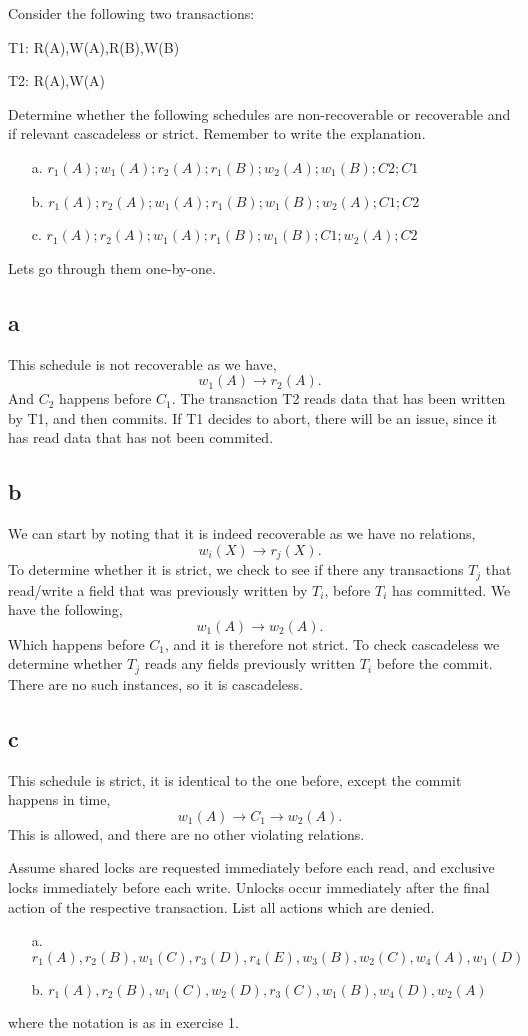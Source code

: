 \documentclass[working, oneside]{../../Preambles/tuftebook}
\begin{document}
\begin{exercise}[2]
Consider the following two transactions:

T1: R(A),W(A),R(B),W(B)

T2: R(A),W(A)

Determine whether the following schedules are non-recoverable or recoverable and if relevant cascadeless or strict. Remember to write the explanation.
\begin{enumerate}
    \item[a.] \(r_1(A); w_1(A); r_2(A); r_1(B); w_2(A); w_1(B); C2; C1\)
    \item[b.] \(r_1(A); r_2(A); w_1(A); r_1(B); w_1(B); w_2(A); C1; C2\)
    \item[c.] \(r_1(A); r_2(A); w_1(A); r_1(B); w_1(B); C1; w_2(A); C2\)
\end{enumerate}
\end{exercise}
Lets go through them one-by-one.
\subsection*{a}
This schedule is not recoverable as we have,
\[
w_1(A) \to r_2(A)
.\]
And $C_2$ happens before $C_1$. The transaction T2 reads data that has been written by T1, and then commits. If T1 decides to abort, there will be an issue, since it has read data that has not been commited.
\subsection*{b}
We can start by noting that it is indeed recoverable as we have no relations,
\[
w_i(X) \to r_j(X)
.\] 
To determine whether it is strict, we check to see if there any transactions $T_j$ that read/write a field that was previously written by $T_i$, before $T_i$ has committed. We have the following,
 \[
w_1\left( A \right) \to w_2\left( A \right) 
.\] 
Which happens before $C_1$, and it is therefore not strict. To check cascadeless we determine whether $T_j$ reads any fields previously written $T_i$ before the commit. There are no such instances, so it is cascadeless.
\subsection*{c}
This schedule is strict, it is identical to the one before, except the commit happens in time,
\[
w_1\left( A \right) \to  C_1 \to w_2\left( A \right)  
.\] 
This is allowed, and there are no other violating relations.
\begin{exercise}[3]
Assume shared locks are requested immediately before each read, and exclusive locks immediately before each write. Unlocks occur immediately after the final action of the respective transaction. List all actions which are denied.
\begin{enumerate}
    \item[a.] \(r_1(A), r_2(B), w_1(C), r_3(D), r_4(E), w_3(B), w_2(C), w_4(A), w_1(D)\)
    \item[b.] \(r_1(A), r_2(B), w_1(C), w_2(D), r_3(C), w_1(B), w_4(D), w_2(A)\)
\end{enumerate}
where the notation is as in exercise 1.
\end{exercise}
\end{document}
